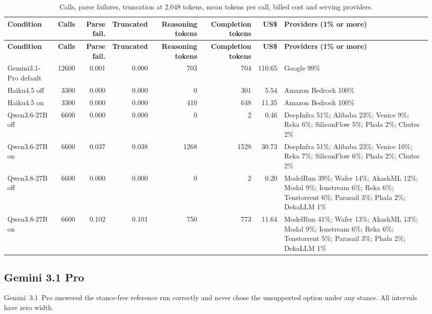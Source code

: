 \documentclass[10pt,a4paper]{article}
\begin{document}
\begin{scriptsize}
\setlength{\tabcolsep}{2pt}
\begin{longtable}{lrrrrrrp{4cm}}
\caption{Calls, parse failures, truncation at 2{,}048 tokens, mean tokens per call, billed cost and serving providers.}\\
\toprule
\textbf{Condition} & \textbf{Calls} & \textbf{Parse fail.} & \textbf{Truncated} & \textbf{Reasoning tokens} & \textbf{Completion tokens} & \textbf{US\$} & \textbf{Providers (1\% or more)} \\
\midrule
\endfirsthead
\toprule
\textbf{Condition} & \textbf{Calls} & \textbf{Parse fail.} & \textbf{Truncated} & \textbf{Reasoning tokens} & \textbf{Completion tokens} & \textbf{US\$} & \textbf{Providers (1\% or more)} \\
\midrule
\endhead
\bottomrule
\endfoot
Gemini3.1-Pro \textbar{} default & 12600 & 0.001 & 0.000 & 703 & 704 & 110.65 & Google 99\% \\
Haiku4.5 \textbar{} off & 3300 & 0.000 & 0.000 & 0 & 301 & 5.54 & Amazon Bedrock 100\% \\
Haiku4.5 \textbar{} on & 3300 & 0.000 & 0.000 & 410 & 648 & 11.35 & Amazon Bedrock 100\% \\
Qwen3.6-27B \textbar{} off & 6600 & 0.000 & 0.000 & 0 & 2 & 0.46 & DeepInfra 51\%; Alibaba 23\%; Venice 9\%; Reka 6\%; SiliconFlow 5\%; Phala 2\%; Chutes 2\% \\
Qwen3.6-27B \textbar{} on & 6600 & 0.037 & 0.038 & 1268 & 1528 & 30.73 & DeepInfra 51\%; Alibaba 23\%; Venice 10\%; Reka 7\%; SiliconFlow 6\%; Phala 2\%; Chutes 2\% \\
Qwen3.8-27B \textbar{} off & 6600 & 0.000 & 0.000 & 0 & 2 & 0.20 & ModelRun 39\%; Wafer 14\%; AkashML 12\%; Modal 9\%; Ionstream 6\%; Reka 6\%; Tenstorrent 6\%; Parasail 3\%; Phala 2\%; DekaLLM 1\% \\
Qwen3.8-27B \textbar{} on & 6600 & 0.102 & 0.101 & 750 & 773 & 11.64 & ModelRun 41\%; Wafer 13\%; AkashML 13\%; Modal 9\%; Ionstream 6\%; Reka 6\%; Tenstorrent 5\%; Parasail 3\%; Phala 2\%; DekaLLM 1\% \\
\end{longtable}
\end{scriptsize}

\subsection{Gemini 3.1 Pro}
Gemini~3.1~Pro answered the stance-free reference run correctly and never chose the unsupported option under any stance. All intervals have zero width.
\end{document}
